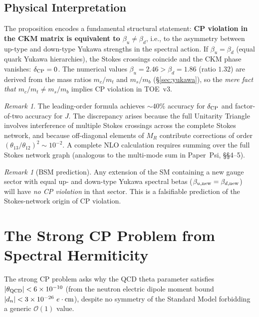 \documentclass[12pt]{article}
\theoremstyle{definition}
\theoremstyle{remark}
\newtheorem{remark}[theorem]{Remark}
\begin{document}
\subsection{Physical Interpretation}

The proposition encodes a fundamental structural statement: \textbf{CP violation in
the CKM matrix is equivalent to $\beta_u \neq \beta_d$}, i.e., to the asymmetry
between up-type and down-type Yukawa strengths in the spectral action.  If
$\beta_u = \beta_d$ (equal quark Yukawa hierarchies), the Stokes crossings coincide
and the CKM phase vanishes: $\delta_{\rm CP} = 0$.  The numerical values
$\beta_u = 2.46 > \beta_d = 1.86$ (ratio $1.32$) are derived from the mass ratios
$m_c/m_t$ and $m_s/m_b$ (§\ref{sec:yukawa}), so the \emph{mere fact that
$m_c/m_t \neq m_s/m_b$} implies CP violation in TOE~v3.

\begin{remark}
The leading-order formula achieves $\sim 40\%$ accuracy for $\delta_{\rm CP}$ and
factor-of-two accuracy for $J$.  The discrepancy arises because the full Unitarity
Triangle involves interference of multiple Stokes crossings across the complete Stokes
network, and because off-diagonal elements of $M_R$ contribute corrections of order
$(\theta_{13}/\theta_{12})^2 \sim 10^{-2}$.  A complete NLO calculation requires
summing over the full Stokes network graph (analogous to the multi-mode sum in
Paper~Psi, §§4--5).
\end{remark}

\begin{remark}[BSM prediction]
Any extension of the SM containing a new gauge sector with equal up- and down-type
Yukawa spectral betas ($\beta_{u,\rm new} = \beta_{d,\rm new}$) will have \emph{no
CP violation} in that sector. This is a falsifiable prediction of the Stokes-network
origin of CP violation.
\end{remark}

\section{The Strong CP Problem from Spectral Hermiticity}
\label{sec:strong_cp}

The strong CP problem asks why the QCD theta parameter satisfies
$|\theta_{\rm QCD}| < 6\times 10^{-10}$ (from the neutron electric dipole moment
bound $|d_n| < 3\times 10^{-26}\ e\cdot{\rm cm}$), despite no symmetry of the
Standard Model forbidding a generic $\mathcal{O}(1)$ value.
\end{document}

